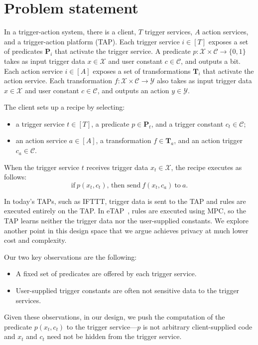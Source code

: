 \section{Problem statement}
\label{sec:problem}

In a trigger-action system, there is a client, $T$ trigger services, $A$ action
services, and a trigger-action platform (TAP). Each trigger service $i \in [T]$
exposes a set of predicates $\mathbf{P}_i$ that activate the trigger service. A
predicate $p : \mathcal{X} \times \mathcal{C} \to \{0,1\}$ takes as input
trigger data $x \in \mathcal{X}$ and user constant $c \in \mathcal{C}$, and
outputs a bit. Each action service $i \in [A]$ exposes a set of transformations
$\mathbf{T}_i$ that activate the action service. Each transformation $f :
\mathcal{X} \times \mathcal{C} \to \mathcal{Y}$ also takes as input trigger data
$x \in \mathcal{X}$ and user constant $c \in \mathcal{C}$, and outputs an action
$y \in \mathcal{Y}$.

The client sets up a recipe by selecting:
\begin{itemize}
  \item a trigger service $t \in [T]$, a predicate $p \in \mathbf{P}_t$, and a
    trigger constant $c_t \in \mathcal{C}$;
  \item an action service $a \in [A]$, a transformation $f \in \mathbf{T}_a$,
    and an action trigger $c_a \in \mathcal{C}$.
\end{itemize}
When the trigger service $t$ receives trigger data $x_t \in \mathcal{X}$, the
recipe executes as follows:
\[
  \text{if}~p(x_t, c_t)\text{, then send}~f(x_t, c_a)~\text{to}~a.
\]

In today's TAPs, such as IFTTT, trigger data is sent to the TAP and rules are
executed entirely on the TAP. In \textsf{eTAP}~\cite{DBLP:conf/sp/ChenCWSCF21},
rules are executed using MPC, so the TAP learns neither the trigger data nor the
user-supplied constants. We explore another point in this design space that we
argue achieves privacy at much lower cost and complexity.

Our two key observations are the following:
\begin{itemize}
  \item A fixed set of predicates are offered by each trigger service.
  \item User-supplied trigger constants are often not sensitive data to the
    trigger services.
\end{itemize}
Given these observations, in our design, we push the computation of the
predicate $p(x_t, c_t)$ to the trigger service---$p$ is not arbitrary
client-supplied code and $x_t$ and $c_t$ need not be hidden from the trigger
service. 

